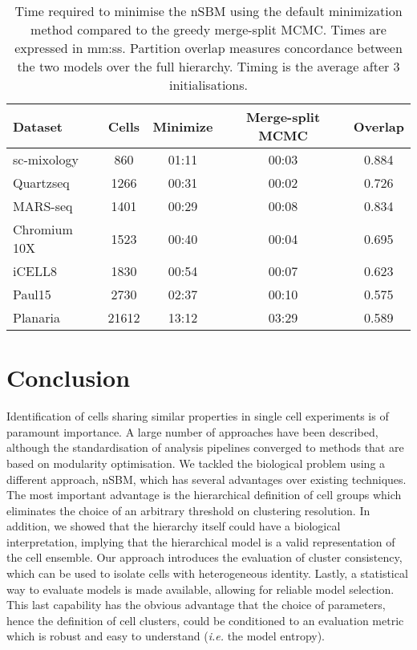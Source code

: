 \documentclass[10pt,letterpaper]{article}
\begin{document}
\begin{table}[h!]
\centering
 \begin{tabular}{|| l c c c c  ||}
 \hline
 \textbf{Dataset} & \textbf{Cells} & \textbf{Minimize} & \textbf{Merge-split MCMC} & \textbf{Overlap} \\ [0.5ex] 
 \hline\hline
 sc-mixology \cite{tian_2019} & 860 & 01:11 & 00:03 & 0.884 \\ 
 \hline
 Quartzseq \cite{mereu_2020} & 1266 & 00:31 & 00:02 & 0.726 \\ 
 \hline
 MARS-seq \cite{mereu_2020} & 1401 & 00:29 & 00:08 & 0.834 \\
 \hline
 Chromium 10X \cite{mereu_2020} & 1523 & 00:40 & 00:04 & 0.695 \\
 \hline
 iCELL8 \cite{mereu_2020} & 1830 & 00:54 & 00:07 & 0.623 \\
 \hline
 Paul15 \cite{paul_2015} & 2730 & 02:37 & 00:10 & 0.575 \\ 
 \hline
 Planaria \cite{plass_2018} & 21612 & 13:12 & 03:29 & 0.589 \\
 \hline
\end{tabular}
\caption{Time required to minimise the nSBM using the default minimization method compared to the greedy merge-split MCMC. Times are expressed in mm:ss. Partition overlap measures concordance between the two models over the full hierarchy. Timing is the average after 3 initialisations.}
\label{Table1}
\end{table}


\section*{Conclusion}

Identification of cells sharing similar properties in single cell experiments is of paramount importance. A large number of approaches have been described, although the standardisation of analysis pipelines converged to methods that are based on modularity optimisation. We tackled the biological problem using a different approach, nSBM, which has several advantages over existing techniques. The most important advantage is the hierarchical definition of cell groups which eliminates the choice of an arbitrary threshold on clustering resolution. In addition, we showed that the hierarchy itself could have a biological interpretation, implying that the hierarchical model is a valid representation of the cell ensemble. Our approach introduces the evaluation of cluster consistency, which can be used to isolate cells with heterogeneous identity. Lastly, a statistical way to evaluate models is made available, allowing for reliable model selection. This last capability has the obvious advantage that the choice of parameters, hence the definition of cell clusters, could be conditioned to an evaluation metric which is robust and easy to understand (\emph{i.e.} the model entropy).
\end{document}
